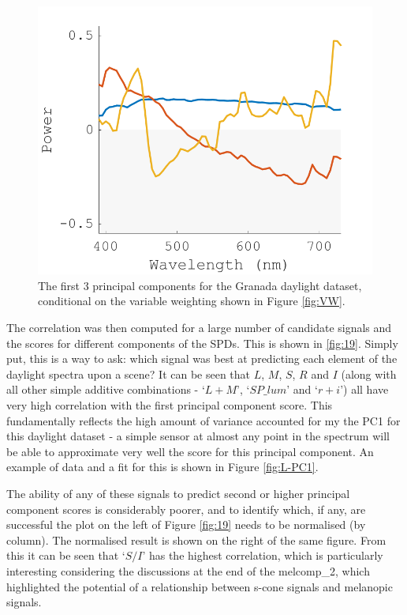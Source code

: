 \begin{figure}[htbp]
 \includegraphics[max width=\textwidth]{figs/comp/melcomp_3/8.png} %
 \caption{The first 3 principal components for the Granada daylight dataset, conditional on the variable weighting shown in Figure \ref{fig:VW}.}
 \label{fig:PCA}
\end{figure} 


The correlation was then computed for a large number of candidate signals and the scores for different components of the \glspl{SPD}. This is shown in \ref{fig:19}. Simply put, this is a way to ask: which signal was best at predicting each element of the daylight spectra upon a scene? It can be seen that $L$, $M$, $S$, $R$ and $I$ (along with all other simple additive combinations - `$L+M$', `$SP\_lum$' and `$r+i$') all have very high correlation with the first principal component score. This fundamentally reflects the high amount of variance accounted for my the \gls{PC1} for this daylight dataset - a simple sensor at almost any point in the spectrum will be able to approximate very well the score for this principal component. An example of data and a fit for this is shown in Figure \ref{fig:L-PC1}.

The ability of any of these signals to predict second or higher principal component scores is considerably poorer, and to identify which, if any, are successful the plot on the left of Figure \ref{fig:19} needs to be normalised (by column). The normalised result is shown on the right of the same figure. From this it can be seen that `$S/I$' has the highest correlation, which is particularly interesting considering the discussions at the end of the melcomp\_2, which highlighted the potential of a relationship between s-cone signals and melanopic signals.


